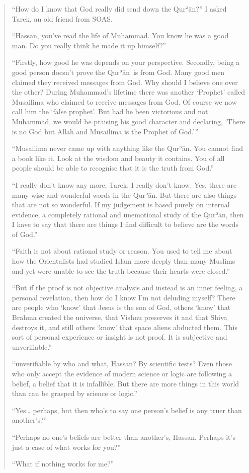 \documentclass[12pt]{memoir}
\def\´{ʾ} %
\newcommand{\cor}[2]{#2} %
\def \Quran{Qur\-\´ān} %
\begin{document}
\begin{quote}
“How do I know that God really did send down the \Quran?”
I asked Tarek, an old friend from SOAS.

“Hassan, you’ve read the life of Muhammad.
You know he was a good man.
Do you really think he made it up himself?”

“Firstly, how good he was depends on your perspective.
Secondly, being a good person doesn’t prove the \Quran\ is from God.
Many good men claimed they received messages from God.
Why should I believe one over the other?
During Muhammad’s lifetime there was another ‘Prophet’
called \cor{Musaylama}{Musailima}
who claimed to receive messages from God.
Of course we now call him the ‘false prophet’.
But had he been victorious and not Muhammad,
we would be praising his good character and declaring,
‘There is no God but Allah
and \cor{Musaylama}{Musailima} is the Prophet of God.’”

“\cor{Musaylama}{Musailima} never came up with anything like the \Quran.
You cannot find a book like it.
Look at the wisdom and beauty it contains.
You of all people should be able to recognise that it is the truth from God.”

“I really don’t know any more, Tarek.
I really don’t know.
Yes, there are many wise and wonderful words in the \Quran.
But there are also things that are not so wonderful.
If my judgement is based purely on internal evidence,
a completely rational and unemotional study of the \Quran,
then I have to say that there are things
I find difficult to believe are the words of God.”

“Faith is not about rational study or reason.
You used to tell me about how the Orientalists
had studied Islam more deeply than many Muslims
and yet were unable to see the truth because their hearts were closed.”

“But if the proof is not objective analysis and instead is an inner feeling,
a personal revelation, then how do I know I’m not deluding myself?
There are people who ‘know’ that Jesus is the son of God, others ‘know’
that Brahma created the universe, that Vishnu preserves it
and that Shiva destroys it, and still others ‘know’
that space aliens abducted them.
This sort of personal experience or insight is not proof.
It is subjective and \cor{un-verifiable}{unverifiable}.”

“\cor{un-verifiable}{unverifiable} by who and what, Hassan?
By scientific tests?
Even those who only accept the evidence of modern science or logic
are following a belief, a belief that it is infallible.
But there are more things in this world
than can be grasped by science or logic.”

“Yes… perhaps, but then who’s to say one person’s belief
is any truer than another’s?”

“Perhaps no one’s beliefs are better than another’s, Hassan.
Perhaps it’s just a case of what works for you?”

“What if nothing works for me?”
\end{quote}
\end{document}
